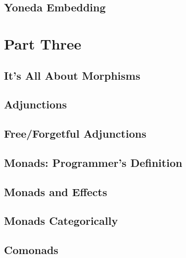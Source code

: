 \chapter{Yoneda Embedding}\label{yoneda-embedding}


\part*{Part Three}

\chapter{It's All About Morphisms}\label{all-about-morphisms}


\chapter{Adjunctions}\label{adjunctions}


\chapter{Free/Forgetful Adjunctions}\label{free-forgetful-adjunctions}


\chapter{Monads: Programmer's Definition}\label{monads-programmers-definition}


\chapter{Monads and Effects}\label{monads-and-effects}


\chapter{Monads Categorically}\label{monads-categorically}


\chapter{Comonads}\label{comonads}


